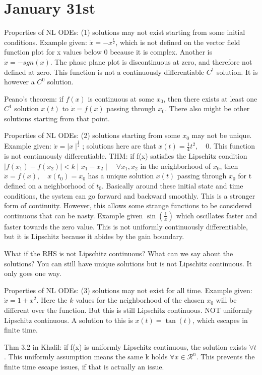 \documentclass[11pt]{article}
\begin{document}
\section*{January 31st} %
\label{sec:jan31}
Properties of NL ODEs: (1) solutions may not exist starting from some initial conditions. Example given: $\dot{x}=-x^{\frac{1}{2}}$, which is not defined on the vector field function plot for x values below 0 because it is complex. Another is $\dot{x} = -sgn(x)$. The phase plane plot is discontinuous at zero, and therefore not defined at zero. This function is not a continuously differentiable $C^1$ solution. It is however a $C^0$ solution. 

Peano's theorem: if $f(x)$ is continuous at some $x_0$, then there exists at least one $C^1$ solution $x(t)$ to $\dot{x}=f(x)$ passing through $x_0$. There also might be other solutions starting from that point.

Properties of NL ODEs: (2) solutions starting from some $x_0$ may not be unique. Example given: $\dot{x} = \mid x \mid^{\frac{1}{2}}$; solutions here are that $x(t) = \frac{1}{4}t^2,\quad 0$. This function is not continuously differentiable.  THM: if f(x) satisfies the Lipschitz condition $\mid f(x_1) - f(x_2)\mid < k\mid x_1 - x_2 \mid \quad \forall x_1,x_2$
in the neighborhood of $x_0$, then $\dot{x} = f(x), \quad x(t_0) = x_0$ has a unique solution $x(t)$ passing through $x_0$ for t defined on a neighborhood of $t_0$. Basically around these initial state and time conditions, the system can go forward and backward smoothly. This is a stronger form of continuity. However, this allows some strange functions to be considered continuous that can be nasty. Example given $\sin(\frac{1}{x})$ which oscillates faster and faster towards the zero value. This is not uniformly continuously differentiable, but it is Lipschitz because it abides by the gain boundary.

What if the RHS is not Lipschitz continuous? What can we say about the solutions? You can still have unique solutions but is not Lipschitz continuous. It only goes  one way.

Properties of NL ODEs: (3) solutions may not exist for all time. Example given: $\dot{x} = 1+x^2$. Here the $k$ values for the neighborhood of the chosen $x_0$ will be different over the function. But this is still Lipschitz continuous. NOT uniformly Lipschitz continuous. A solution to this is $x(t)=\tan(t)$, which escapes in finite time. 

Thm 3.2 in Khalil: if f(x) is uniformly Lipschitz continuous, the solution exists $\forall t$. This uniformly assumption means the same k holds $\forall x \in \mathcal{R}^n$. This prevents the finite time escape issues, if that is actually an issue.
\end{document}
